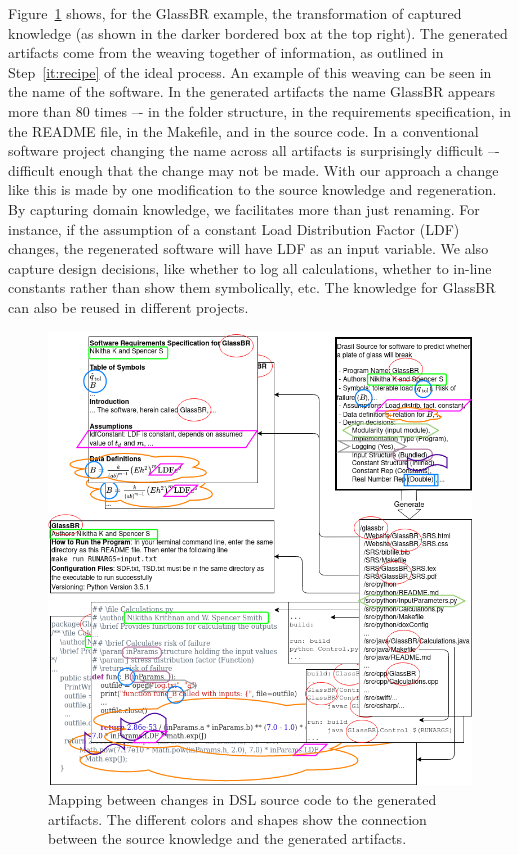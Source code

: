 \documentclass[sigconf,review]{acmart}
\begin{document}
Figure~\ref{Fig_DrasilAndChange} shows, for the GlassBR example, the
transformation of captured knowledge (as shown in the darker bordered box at the
top right). The generated artifacts come from the weaving together of
information, as outlined in Step~\ref{it:recipe} of the ideal process.  An
example of this weaving can be seen in the name of the software.  In the
generated artifacts the name GlassBR appears more than 80 times –- in the folder
structure, in the requirements specification, in the README file, in the
Makefile, and in the source code. In a conventional software project changing
the name across all artifacts is surprisingly difficult –- difficult enough that
the change may not be made. With our approach a change like this is made by one
modification to the source knowledge and regeneration. By capturing domain
knowledge, we facilitates more than just renaming. For instance, if the
assumption of a constant Load Distribution Factor (LDF) changes, the regenerated
software will have LDF as an input variable. We also capture design decisions,
like whether to log all calculations, whether to in-line constants rather than
show them symbolically, etc. The knowledge for GlassBR can also be reused in
different projects.

\begin{figure}[h]
  \centering
  \includegraphics[width=\linewidth]{assets/DrasilSupportsChange-right-portrait-overlapped-ungrouped-v1.drawio.png}
  \caption{Mapping between changes in DSL source code to the generated
  artifacts. The different colors and shapes show the connection between the
  source knowledge and the generated artifacts.}
  \label{Fig_DrasilAndChange}
\end{figure}
\end{document}
